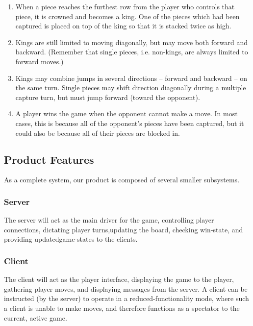 \documentclass[letterpaper]{article}
\begin{document}
\begin{enumerate}
    \item When a piece reaches the furthest row from the player
          who controls that piece, it is crowned and becomes a
          king. One of the pieces which had been captured is
          placed on top of the king so that it is stacked twice
          as high.

    \item Kings are still limited to moving diagonally, but may
          move both forward and backward. (Remember that single
          pieces, i.e. non-kings, are always limited to forward
          moves.)
          
    \item Kings may combine jumps in several directions --
          forward and backward -- on the same turn. Single
          pieces may shift direction diagonally during a
          multiple capture turn, but must jump forward (toward
          the opponent).

    \item A player wins the game when the opponent cannot make a
          move. In most cases, this is because all of the
          opponent's pieces have been captured, but it could
          also be because all of their pieces are blocked in.
\end{enumerate}

\subsection{Product Features}
\label{sec:description_features}

As a complete system, our product is composed of several smaller
subsystems.



\subsubsection{Server}
\label{sec:description_product_server}

The server will act as the main driver for the game, controlling
player connections, dictating player turns,updating the board,
checking win-state, and providing updatedgame-states to the
clients.

\subsubsection{Client}
\label{sec:description_product_client}

The client will act as the player interface, displaying the game
to the player, gathering player moves, and displaying messages
from the server. A client can be instructed (by the server) to
operate in a reduced-functionality mode, where such a client is
unable to make moves, and therefore functions as a spectator to
the current, active game.
\end{document}
